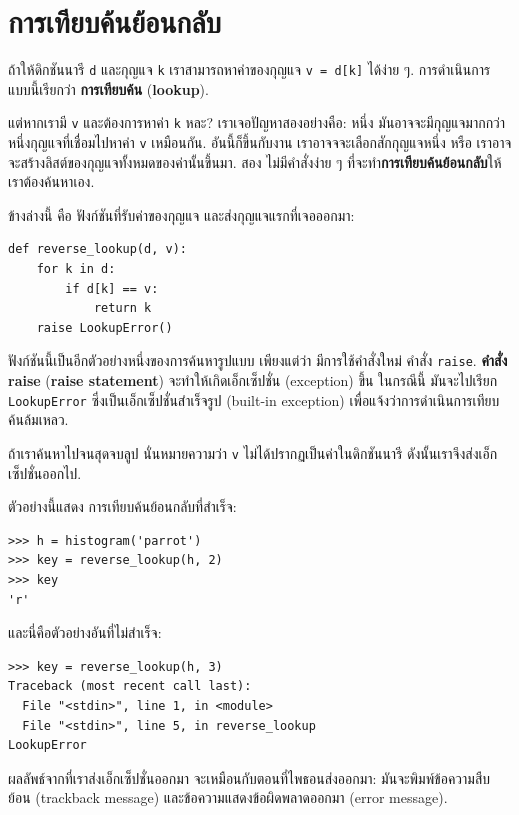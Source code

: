 \section{การเทียบค้นย้อนกลับ}
\label{raise}

ถ้าให้ดิกชันนารี \texttt{d} และกุญแจ \texttt{k}
เราสามารถหาค่าของกุญแจ \texttt{v = d[k]} ได้ง่าย ๆ.
การดำเนินการแบบนี้เรียกว่า \textbf{การเทียบค้น} (\textbf{lookup}).

แต่หากเรามี \texttt{v} และต้องการหาค่า \texttt{k} หละ?
เราเจอปัญหาสองอย่างคือ: หนึ่ง มันอาจจะมีกุญแจมากกว่าหนึ่งกุญแจที่เชื่อมไปหาค่า \texttt{v} เหมือนกัน.
อันนี้ก็ขึ้นกับงาน เราอาจจจะเลือกสักกุญแจหนึ่ง 
หรือ เราอาจจะสร้างลิสต์ของกุญแจทั้งหมดของค่านั้นขึ้นมา.
สอง ไม่มีคำสั่งง่าย ๆ ที่จะทำ\textbf{การเทียบค้นย้อนกลับ}ให้
เราต้องค้นหาเอง.

ข้างล่างนี้ คือ ฟังก์ชันที่รับค่าของกุญแจ
และส่งกุญแจแรกที่เจอออกมา:

\begin{verbatim}
def reverse_lookup(d, v):
    for k in d:
        if d[k] == v:
            return k
    raise LookupError()
\end{verbatim}
%
ฟังก์ชันนี้เป็นอีกตัวอย่างหนึ่งของการค้นหารูปแบบ
เพียงแต่ว่า มีการใช้คำสั่งใหม่ คำสั่ง \texttt{raise}.
\textbf{คำสั่ง raise} (\textbf{raise statement}) จะทำให้เกิดเอ็กเซ็ปชั่น (exception) ขึ้น
ในกรณีนี้ มันจะไปเรียก \texttt{LookupError} ซึ่งเป็นเอ็กเซ็ปชั่นสำเร็จรูป (built-in exception) เพื่อแจ้งว่าการดำเนินการเทียบค้นล้มเหลว.
  
 

ถ้าเราค้นหาไปจนสุดจบลูป นั่นหมายความว่า \texttt{v} ไม่ได้ปรากฏเป็นค่าในดิกชันนารี
ดังนั้นเราจึงส่งเอ็กเซ็ปชั่นออกไป.


ตัวอย่างนี้แสดง การเทียบค้นย้อนกลับที่สำเร็จ:

\begin{verbatim}
>>> h = histogram('parrot')
>>> key = reverse_lookup(h, 2)
>>> key
'r'
\end{verbatim}
%
และนี่คือตัวอย่างอันที่ไม่สำเร็จ:

\begin{verbatim}
>>> key = reverse_lookup(h, 3)
Traceback (most recent call last):
  File "<stdin>", line 1, in <module>
  File "<stdin>", line 5, in reverse_lookup
LookupError
\end{verbatim}
%
ผลลัพธ์จากที่เราส่งเอ็กเซ็ปชั่นออกมา จะเหมือนกับตอนที่ไพธอนส่งออกมา:
มันจะพิมพ์ข้อความสืบย้อน (trackback message) และข้อความแสดงข้อผิดพลาดออกมา (error message).

